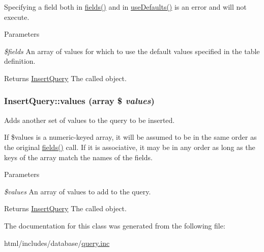 Specifying a field both in \hyperlink{classInsertQuery_a80eebdf6db8f9b25998d68217fb9ba69}{fields()} and in \hyperlink{classInsertQuery_a5d584ac1930b6a791e0c5701d556cb65}{useDefaults()} is an error and will not execute.


\begin{DoxyParams}{Parameters}
\item[{\em \$fields}]An array of values for which to use the default values specified in the table definition.\end{DoxyParams}
\begin{DoxyReturn}{Returns}
\hyperlink{classInsertQuery}{InsertQuery} The called object. 
\end{DoxyReturn}
\hypertarget{classInsertQuery_a7b248332d48bde48cfef6e18b1b6fb7c}{
\subsubsection[{values}]{\setlength{\rightskip}{0pt plus 5cm}InsertQuery::values (array \$ {\em values})}}
\label{classInsertQuery_a7b248332d48bde48cfef6e18b1b6fb7c}
Adds another set of values to the query to be inserted.

If \$values is a numeric-\/keyed array, it will be assumed to be in the same order as the original \hyperlink{classInsertQuery_a80eebdf6db8f9b25998d68217fb9ba69}{fields()} call. If it is associative, it may be in any order as long as the keys of the array match the names of the fields.


\begin{DoxyParams}{Parameters}
\item[{\em \$values}]An array of values to add to the query.\end{DoxyParams}
\begin{DoxyReturn}{Returns}
\hyperlink{classInsertQuery}{InsertQuery} The called object. 
\end{DoxyReturn}


The documentation for this class was generated from the following file:\begin{DoxyCompactItemize}
\item 
html/includes/database/\hyperlink{query_8inc}{query.inc}\end{DoxyCompactItemize}

